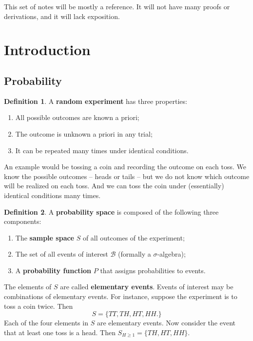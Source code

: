 \documentclass[12pt]{article}
\theoremstyle{definition}
\newtheorem{definition}{Definition}
\begin{document}
\maketitle
\onehalfspace


\noindent This set of notes will be mostly a reference. It will not have many proofs or derivations, and it will lack exposition. 


\section{Introduction}


\subsection{Probability}

\begin{definition}
	A \textbf{random experiment} has three properties:
	\begin{enumerate}
		\item All possible outcomes are known a priori;
		\item The outcome is unknown a priori in any trial;
		\item It can be repeated many times under identical conditions.
	\end{enumerate}
\end{definition}

An example would be tossing a coin and recording the outcome on each toss. We know the possible outcomes -- heads or tails -- but we do not know which outcome will be realized on each toss. And we can toss the coin under (essentially) identical conditions many times.

\begin{definition}
	A \textbf{probability space} is composed of the following three components:
	\begin{enumerate}
		\item The \textbf{sample space} $S$ of all outcomes of the experiment;
		\item The set of all events of interest $\mathcal{B}$ (formally a $\sigma$-algebra);
		\item A \textbf{probability function} $P$ that assigns probabilities to events.
	\end{enumerate}
\end{definition}

The elements of $S$ are called \textbf{elementary events}. Events of interest may be combinations of elementary events. For instance, suppose the experiment is to toss a coin twice. Then
	\[	S = \{TT, TH, HT, HH.\}\]	
Each of the four elements in $S$ are elementary events. Now consider the event that at least one toss is a head. Then $S_{H\geq1} = \{TH, HT, HH\}$. 
\end{document}
